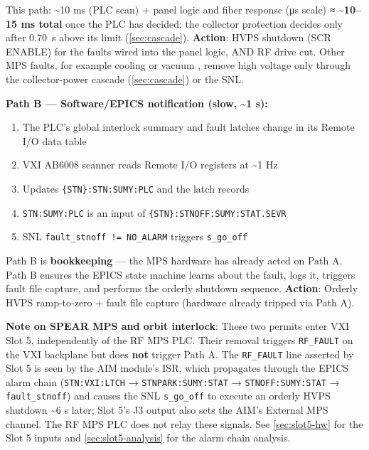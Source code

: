 This path: \textasciitilde10 ms (PLC scan) + panel logic and fiber response (μs scale) ≈ \textbf{\textasciitilde10--15 ms total} once the PLC has decided; the collector protection decides only after \qty{0.70}{\second} above its limit (\cref{sec:cascade}).
\textbf{Action}: HVPS shutdown (SCR ENABLE) for the faults wired into the panel logic, AND RF drive cut. Other MPS faults, for example cooling or vacuum , remove high voltage only through the collector-power cascade (\cref{sec:cascade}) or the SNL.

\textbf{Path B --- Software/EPICS notification (slow, \textasciitilde1 s):}

\begin{enumerate}
\def\labelenumi{\arabic{enumi}.}
\tightlist
\item
  The PLC's global interlock summary and fault latches change in its Remote I/O data table
\item
  VXI AB6008 scanner reads Remote I/O registers at \textasciitilde1 Hz
\item
  Updates \texttt{\{STN\}:\allowbreak{}STN:\allowbreak{}SUMY:\allowbreak{}PLC} and the latch records 
\item
  \texttt{STN:\allowbreak{}SUMY:\allowbreak{}PLC} is an input of \texttt{\{STN\}:\allowbreak{}STNOFF:\allowbreak{}SUMY:\allowbreak{}STAT.\allowbreak{}SEVR} 
\item
  SNL \texttt{fault\_\allowbreak{}stnoff\ !=\ NO\_\allowbreak{}ALARM} triggers \texttt{s\_go\_off}
\end{enumerate}

Path B is \textbf{bookkeeping} --- the MPS hardware has already acted on Path A. Path B ensures the EPICS state machine learns about the fault, logs it, triggers fault file capture, and performs the orderly shutdown sequence.
\textbf{Action}: Orderly HVPS ramp-to-zero + fault file capture (hardware already tripped via Path A).

\begin{keynote}
\textbf{Note on SPEAR MPS and orbit interlock}: These two permits enter VXI Slot 5, independently of the RF MPS PLC. Their removal triggers \texttt{RF\_FAULT} on the VXI backplane but does \textbf{not} trigger Path A. The \texttt{RF\_FAULT} line asserted by Slot 5 is seen by the AIM module's ISR, which propagates through the EPICS alarm chain (\texttt{STN:VXI:LTCH} → \texttt{STNPARK:\allowbreak{}SUMY:\allowbreak{}STAT} → \texttt{STNOFF:\allowbreak{}SUMY:\allowbreak{}STAT} → \texttt{fault\_stnoff}) and causes the SNL \texttt{s\_go\_off} to execute an orderly HVPS shutdown \textasciitilde6 s later; Slot 5's J3 output also sets the AIM's External MPS channel. The RF MPS PLC does not relay these signals. See \cref{sec:slot5-hw} for the Slot 5 inputs and \cref{sec:slot5-analysis} for the alarm chain analysis.
\end{keynote}

